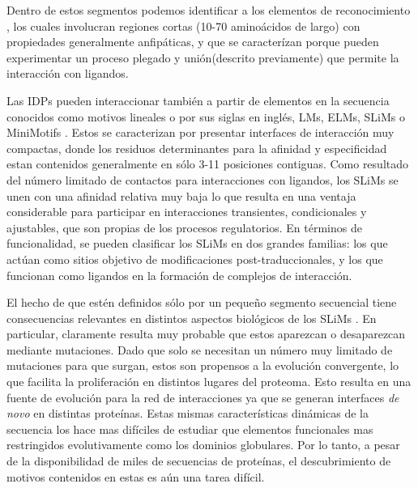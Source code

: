 Dentro de estos segmentos podemos identificar a los elementos de reconocimiento \cite{mohan2006analysis,vacic2007characterization,oldfield2005coupled}, los cuales involucran regiones cortas (10-70 aminoácidos de largo) 
con propiedades generalmente anfipáticas, y que se caracterízan porque pueden experimentar un proceso plegado y unión(descrito previamente) que permite la interacción con ligandos.  



% 
% 
Las IDPs pueden interaccionar también a partir de elementos en la secuencia conocidos como motivos lineales o por sus siglas en inglés, LMs, ELMs, SLiMs o MiniMotifs \cite{van2014short}. 
Estos se caracterizan por presentar interfaces de interacción muy compactas, donde los residuos determinantes para la afinidad y especificidad estan contenidos generalmente en sólo 3-11 posiciones contiguas.
Como resultado del número limitado de contactos para interacciones con ligandos, los SLiMs se unen con una afinidad relativa muy baja lo que resulta en una ventaja considerable 
para participar en interacciones transientes, condicionales y  ajustables, que son propias de los procesos regulatorios.
En términos de funcionalidad, se pueden clasificar los SLiMs en dos grandes familias: los que actúan como sitios objetivo de modificaciones post-traduccionales, 
y los que funcionan como ligandos en la formación de complejos de interacción.



% 
% 
El hecho de que estén definidos sólo por un pequeño segmento secuencial tiene consecuencias relevantes en distintos aspectos biológicos de los SLiMs \cite{davey2012attributes}.
En particular, claramente resulta muy probable que estos aparezcan o desaparezcan mediante mutaciones. 
Dado que solo se necesitan un número muy limitado de mutaciones para que surgan, estos son propensos a la evolución convergente, lo que facilita la proliferación en distintos lugares del proteoma.
Esto resulta en una fuente de evolución para la red de interacciones ya que se generan interfaces \textit{de novo} en distintas proteínas.
Estas mismas características dinámicas de la secuencia los hace mas difíciles de estudiar que elementos funcionales mas restringidos evolutivamente como los dominios globulares.
Por lo tanto, a pesar de la disponibilidad de miles de secuencias de proteínas, el descubrimiento de motivos contenidos en estas es aún una tarea difícil.

